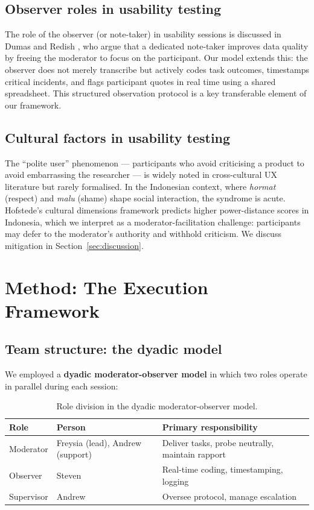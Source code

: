 \documentclass[conference]{IEEEtran}
\begin{document}
\subsection{Observer roles in usability testing}

The role of the observer (or note-taker) in usability sessions is discussed in Dumas and Redish
\cite{dumas}, who argue that a dedicated note-taker improves data quality by freeing the moderator
to focus on the participant. Our model extends this: the observer does not merely transcribe but
actively codes task outcomes, timestamps critical incidents, and flags participant quotes in real time
using a shared spreadsheet. This structured observation protocol is a key transferable element of our
framework.

\subsection{Cultural factors in usability testing}

The ``polite user'' phenomenon --- participants who avoid criticising a product to avoid embarrassing
the researcher --- is widely noted in cross-cultural UX literature but rarely formalised. In the
Indonesian context, where \emph{hormat} (respect) and \emph{malu} (shame) shape social interaction,
the syndrome is acute. Hofstede's cultural dimensions framework \cite{hofstede} predicts higher
power-distance scores in Indonesia, which we interpret as a moderator-facilitation challenge:
participants may defer to the moderator's authority and withhold criticism. We discuss mitigation in
Section~\ref{sec:discussion}.

\section{Method: The Execution Framework}

\subsection{Team structure: the dyadic model}

We employed a \textbf{dyadic moderator-observer model} in which two roles operate in parallel during
each session:

\begin{table}[h]
\caption{Role division in the dyadic moderator-observer model.}
\label{tab:roles}
\centering
\begin{tabular}{@{}lll@{}}
\toprule
Role & Person & Primary responsibility \\
\midrule
Moderator & Freysia (lead), Andrew (support) & Deliver tasks, probe neutrally, maintain rapport \\
Observer & Steven & Real-time coding, timestamping, logging \\
Supervisor & Andrew & Oversee protocol, manage escalation \\
\bottomrule
\end{tabular}
\end{table}
\end{document}
